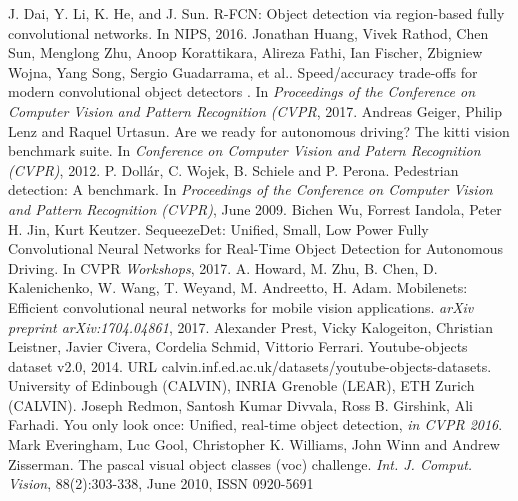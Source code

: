 \documentclass[conference]{IEEEtran}
\begin{document}
\begin{thebibliography}{00}
 J. Dai, Y. Li, K. He, and J. Sun. R-FCN: Object detection via
region-based fully convolutional networks. In NIPS, 2016.
 Jonathan Huang, Vivek Rathod, Chen Sun, Menglong Zhu, Anoop Korattikara, Alireza Fathi, Ian Fischer, Zbigniew Wojna, Yang Song, Sergio Guadarrama, et al.. Speed/accuracy trade-offs for modern convolutional object detectors . In \textit{Proceedings of the Conference on Computer Vision and Pattern Recognition (CVPR}, 2017.
 Andreas Geiger, Philip Lenz and Raquel Urtasun. Are we ready for autonomous driving? The kitti vision benchmark suite. In \textit{Conference on Computer Vision and Patern Recognition (CVPR)}, 2012.
 P. Dollár, C. Wojek, B. Schiele and P. Perona. Pedestrian detection: A benchmark. In \textit{Proceedings of the Conference on Computer Vision and Pattern Recognition (CVPR)}, June 2009.
 Bichen Wu, Forrest Iandola, Peter H. Jin, Kurt Keutzer. SequeezeDet: Unified, Small, Low Power Fully Convolutional Neural Networks for Real-Time Object Detection for Autonomous Driving. In CVPR \textit{Workshops}, 2017.
 A. Howard, M. Zhu, B. Chen, D. Kalenichenko, W. Wang, T. Weyand, M. Andreetto, H. Adam. Mobilenets: Efficient convolutional neural networks for mobile vision applications. \textit{arXiv preprint arXiv:1704.04861}, 2017.
 Alexander Prest, Vicky Kalogeiton, Christian Leistner, Javier Civera, Cordelia Schmid, Vittorio Ferrari. Youtube-objects dataset v2.0, 2014. URL calvin.inf.ed.ac.uk/datasets/youtube-objects-datasets. University of Edinbough (CALVIN), INRIA Grenoble (LEAR), ETH Zurich (CALVIN). 
 Joseph Redmon, Santosh Kumar Divvala, Ross B. Girshink, Ali Farhadi. You only look once: Unified, real-time object detection, \textit{in CVPR 2016}.
 Mark Everingham, Luc Gool, Christopher K. Williams, John Winn and Andrew Zisserman. The pascal visual object classes (voc) challenge. \textit{Int. J. Comput. Vision}, 88(2):303-338, June 2010, ISSN 0920-5691
\end{thebibliography}
\vspace{12pt}
\end{document}
